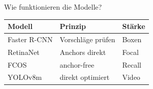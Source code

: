 \begin{frame}{Wie funktionieren die Modelle?}
\scriptsize
\begin{tabular}{l l l}
\toprule
Modell & Prinzip & Stärke \\
\midrule
Faster R-CNN \cite{Ren2015FasterRCNN} & Vorschläge prüfen & Boxen \\
RetinaNet \cite{Lin2017FocalLoss} & Anchors direkt & Focal \\
FCOS \cite{Tian2019FCOS} & anchor-free & Recall \\
YOLOv8m \cite{Yaseen2024YOLOv8} & direkt optimiert & Video \\
\bottomrule
\end{tabular}
\end{frame}

